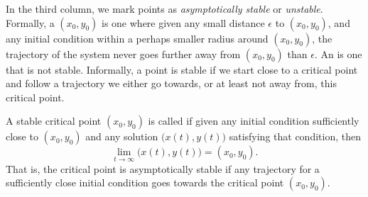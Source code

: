 In the third column,
we mark points as \emph{asymptotically stable} or \emph{unstable}.  Formally, a
\emph{} $(x_0,y_0)$ is one where given any small distance $\epsilon$ to
$(x_0,y_0)$, and any initial condition within a perhaps smaller radius
around $(x_0,y_0)$, the trajectory
of the system never goes further away from $(x_0,y_0)$ than $\epsilon$.
An \emph{} is one that is not stable.
Informally, a point is stable if we start close to a critical point and
follow a trajectory we either go towards, or at least not away
from,
this critical point.

A stable critical point $(x_0,y_0)$ is called \emph{} if
given any initial condition sufficiently close to $(x_0,y_0)$ and any
solution $\bigl( x(t), y(t) \bigr)$ satisfying that condition, then
\begin{equation*}
\lim_{t \to \infty} \bigl( x(t), y(t) \bigr) = (x_0,y_0) .
\end{equation*}
That is, the critical point is asymptotically stable
if any trajectory for a sufficiently close initial condition
goes towards the critical point $(x_0,y_0)$.

